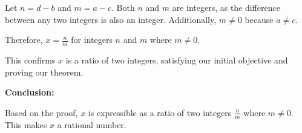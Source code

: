 \documentclass[12pt]{article}
\begin{document}
Let \( n = d - b \) and \( m = a - c \). Both \( n \) and \( m \) are integers, as the difference between any two integers is also an integer. Additionally, \( m \neq 0 \) because \( a \neq c \).

Therefore, \( x = \frac{n}{m} \) for integers \( n \) and \( m \) where \( m \neq 0 \).

This confirms \( x \) is a ratio of two integers, satisfying our initial objective and proving our theorem.

\textbf{Conclusion:}

Based on the proof, \( x \) is expressible as a ratio of two integers \( \frac{n}{m} \) where \( m \neq 0 \). This makes \( x \) a rational number.
\end{document}
